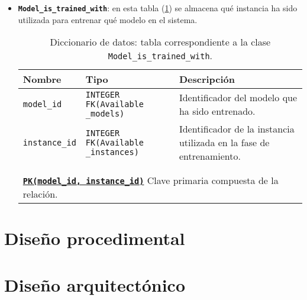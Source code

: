 \begin{itemize}
	\item \textbf{\texttt{Model\_is\_trained\_with}}: en esta tabla (\ref{datadic:modeltrainedwith}) se almacena qué instancia ha sido utilizada para entrenar qué modelo en el sistema.
	
		\begin{table}
		\small
		\begin{centering}
			\begin{tabular}{@{}p{7em} p{7em} p{18em}@{}}
				\toprule
				\textbf{Nombre} & \textbf{Tipo} & \textbf{Descripción}\\
				\midrule
				\texttt{model\_id} & \texttt{INTEGER FK(Available \_models)} & Identificador del modelo que ha sido entrenado. \\
				\texttt{instance\_id} & \texttt{INTEGER FK(Available \_instances)} & Identificador de la instancia utilizada en la fase de entrenamiento. \\\\\\
				\multicolumn{3}{l}{\texttt{\textbf{\underline{PK(model\_id, instance\_id)}}} Clave primaria compuesta de la relación.} \\
				\bottomrule
			\end{tabular}
		\end{centering}
		\caption[Diccionario de datos: Model\_is\_trained\_with]{Diccionario de datos: tabla correspondiente a la clase \texttt{Model\_is\_trained\_with}.}
		\label{datadic:modeltrainedwith}
	\end{table}
\end{itemize}

\section{Diseño procedimental}

\section{Diseño arquitectónico}


